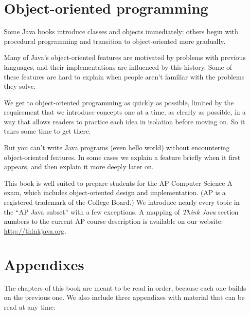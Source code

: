 \documentclass[12pt]{book}
\theoremstyle{exercise}
\begin{document}
\section*{Object-oriented programming}

Some Java books introduce classes and objects immediately; others begin with procedural programming and transition to object-oriented more gradually.

Many of Java's object-oriented features are motivated by problems with previous languages, and their implementations are influenced by this history.
Some of these features are hard to explain when people aren't familiar with the problems they solve.

We get to object-oriented programming as quickly as possible, limited by the requirement that we introduce concepts one at a time, as clearly as possible, in a way that allows readers to practice each idea in isolation before moving on.
So it takes some time to get there.

But you can't write Java programs (even hello world) without encountering object-oriented features.
In some cases we explain a feature briefly when it first appears, and then explain it more deeply later on.

This book is well suited to prepare students for the AP Computer Science A exam, which includes object-oriented design and implementation.
(AP is a registered trademark of the College Board.)
We introduce nearly every topic in the ``AP Java subset'' with a few exceptions.
A mapping of {\it Think Java} section numbers to the current AP course description is available on our website: \url{http://thinkjava.org}.


\section*{Appendixes}

The chapters of this book are meant to be read in order, because each one builds on the previous one.
We also include three appendixes with material that can be read at any time:
\end{document}
